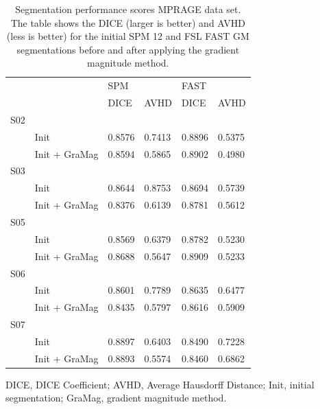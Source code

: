 \begin{table}[!ht]
\centering
\caption{
Segmentation performance scores MPRAGE data set. The table shows the DICE (larger is better) and AVHD (less is better) for the initial SPM 12 and FSL FAST GM segmentations before and after applying the gradient magnitude method.}
\begin{tabular}{llllll}
\hline
     &                & \vline SPM   &      & \vline FAST   &      \\
     &                & \vline DICE  & AVHD & \vline DICE       & AVHD \\
\hline
 S02 &                &            &            &             &             \\
     & Init           & 0.8576     & 0.7413     & 0.8896      & 0.5375      \\
     & Init + GraMag  & 0.8594     & 0.5865     & 0.8902      & 0.4980      \\
 S03 &                &            &            &             &             \\
     & Init           & 0.8644     & 0.8753     & 0.8694      & 0.5739      \\
     & Init + GraMag  & 0.8376     & 0.6139     & 0.8781      & 0.5612      \\
 S05 &                &            &            &             &             \\
     & Init           & 0.8569     & 0.6379     & 0.8782      & 0.5230      \\
     & Init + GraMag  & 0.8688     & 0.5647     & 0.8909      & 0.5233      \\
 S06 &                &            &            &             &             \\
     & Init           & 0.8601     & 0.7789     & 0.8635      & 0.6477      \\
     & Init + GraMag  & 0.8435     & 0.5797     & 0.8616      & 0.5909      \\
 S07 &                &            &            &             &             \\
     & Init           & 0.8897     & 0.6403     & 0.8490      & 0.7228      \\
     & Init + GraMag  & 0.8893     & 0.5574     & 0.8460      & 0.6862      \\
\hline
\end{tabular}
\begin{flushleft}
DICE, DICE Coefficient; AVHD, Average Hausdorff Distance; Init, initial segmentation; GraMag, gradient magnitude method.\\
\end{flushleft}
\label{tab:table1}
\end{table}

